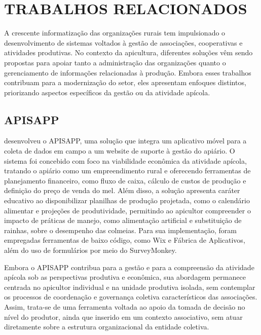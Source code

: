 \chapter{TRABALHOS RELACIONADOS}
\label{cap:trabalhos_relacionados}

A crescente informatização das organizações rurais tem impulsionado o desenvolvimento de sistemas voltados à gestão de associações, cooperativas e atividades produtivas. No contexto da apicultura, diferentes soluções vêm sendo propostas para apoiar tanto a administração das organizações quanto o gerenciamento de informações relacionadas à produção. Embora esses trabalhos contribuam para a modernização do setor, eles apresentam enfoques distintos, priorizando aspectos específicos da gestão ou da atividade apícola.


\section{APISAPP}
\label{sec:apisapp}

 desenvolveu o APISAPP, uma solução que integra um aplicativo móvel para a coleta de dados em campo a um website de suporte à gestão do apiário. O sistema foi concebido com foco na viabilidade econômica da atividade apícola, tratando o apiário como um empreendimento rural e oferecendo ferramentas de planejamento financeiro, como fluxo de caixa, cálculo de custos de produção e definição do preço de venda do mel. Além disso, a solução apresenta caráter educativo ao disponibilizar planilhas de produção projetada, como o calendário alimentar e projeções de produtividade, permitindo ao apicultor compreender o impacto de práticas de manejo, como alimentação artificial e substituição de rainhas, sobre o desempenho das colmeias. Para sua implementação, foram empregadas ferramentas de baixo código, como Wix e Fábrica de Aplicativos, além do uso de formulários por meio do SurveyMonkey.

Embora o APISAPP contribua para a gestão e para a compreensão da atividade apícola sob as perspectivas produtiva e econômica, sua abordagem permanece centrada no apicultor individual e na unidade produtiva isolada, sem contemplar os processos de coordenação e governança coletiva característicos das associações. Assim, trata-se de uma ferramenta voltada ao apoio da tomada de decisão no nível do produtor, ainda que inserido em um contexto associativo, sem atuar diretamente sobre a estrutura organizacional da entidade coletiva.


